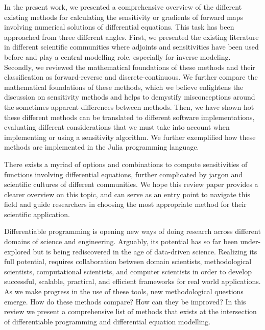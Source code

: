 In the present work, we presented a comprehensive overview of the different existing methods for calculating the sensitivity or gradients of forward maps involving numerical solutions of differential equations.
This task has been approached from three different angles.
First, we presented the existing literature in different scientific communities where adjoints and sensitivities have been used before and play a central modelling role, especially for inverse modeling.
Secondly, we reviewed the mathematical foundations of these methods and their classification as forward-reverse and discrete-continuous.
We further compare the mathematical foundations of these methods, which we believe enlightens the discussion on sensitivity methods and helps to demystify  misconceptions around the sometimes apparent differences between methods.  
Then, we have shown hot these different methods can be translated to different software implementations, evaluating different considerations that we must take into account when implementing or using a sensitivity algorithm. 
We further exemplified how these methods are implemented in the Julia programming language. 

There exists a myriad of options and combinations to compute sensitivities of functions involving differential equations, further complicated by jargon and scientific cultures of different communities. 
We hope this review paper provides a clearer overview on this topic, and can serve as an entry point to navigate this field and guide researchers in choosing the most appropriate method for their scientific application.

Differentiable programming is opening new ways of doing research across different domains of science and engineering. 
Arguably, its potential has so far been under-explored but is being rediscovered in the age of data-driven science. 
Realizing its full potential, requires collaboration between domain scientists, methodological scientists, computational scientists, and computer scientists in order to develop successful, scalable, practical, and efficient frameworks for real world applications.
As we make progress in the use of these tools, new methodological questions emerge. 
How do these methods compare? How can they be improved? 
In this review we present a comprehensive list of methods that exists at the intersection of differentiable programming and differential equation modelling. 

